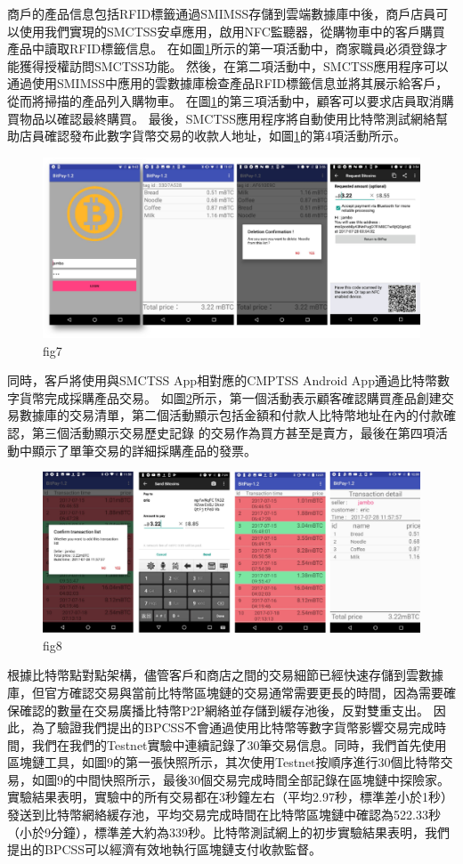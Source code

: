 商戶的產品信息包括RFID標籤通過SMIMSS存儲到雲端數據庫中後，商戶店員可以使用我們實現的SMCTSS安卓應用，啟用NFC監聽器，從購物車中的客戶購買產品中讀取RFID標籤信息。 在如圖\ref{fig7}所示的第一項活動中，商家職員必須登錄才能獲得授權訪問SMCTSS功能。 然後，在第二項活動中，SMCTSS應用程序可以通過使用SMIMSS中應用的雲數據庫檢查產品RFID標籤信息並將其展示給客戶，從而將掃描的產品列入購物車。 在圖\ref{fig7}的第三項活動中，顧客可以要求店員取消購買物品以確認最終購買。 最後，SMCTSS應用程序將自動使用比特幣測試網絡幫助店員確認發布此數字貨幣交易的收款人地址，如圖\ref{fig7}的第4項活動所示。    
\begin{figure}[h]
	\centering
	\includegraphics[width = 1\textwidth]{fig7.png}
	\caption{fig7}\label{fig7}
\end{figure}
同時，客戶將使用與SMCTSS App相對應的CMPTSS Android App通過比特幣數字貨幣完成採購產品交易。 如圖\ref{fig8}所示，第一個活動表示顧客確認購買產品創建交易數據庫的交易清單，第二個活動顯示包括金額和付款人比特幣地址在內的付款確認，第三個活動顯示交易歷史記錄 的交易作為買方甚至是賣方，最後在第四項活動中顯示了單筆交易的詳細採購產品的發票。    
\begin{figure}[h]
	\centering
	\includegraphics[width = 1\textwidth]{fig8.png}
	\caption{fig8}\label{fig8}
\end{figure}

根據比特幣點對點架構，儘管客戶和商店之間的交易細節已經快速存儲到雲數據庫，但官方確認交易與當前比特幣區塊鏈的交易通常需要更長的時間，因為需要確保確認的數量在交易廣播比特幣P2P網絡並存儲到緩存池後，反對雙重支出。
因此，為了驗證我們提出的BPCSS不會通過使用比特幣等數字貨幣影響交易完成時間，我們在我們的Testnet實驗中連續記錄了30筆交易信息。同時，我們首先使用區塊鏈工具，如圖9的第一張快照所示，其次使用Testnet按順序進行30個比特幣交易，如圖9的中間快照所示，最後30個交易完成時間全部記錄在區塊鏈中探險家。實驗結果表明，實驗中的所有交易都在3秒鐘左右（平均2.97秒，標準差小於1秒）發送到比特幣網絡緩存池，平均交易完成時間在比特幣區塊鏈中確認為522.33秒（小於9分鐘），標準差大約為339秒。比特幣測試網上的初步實驗結果表明，我們提出的BPCSS可以經濟有效地執行區塊鏈支付收款監督。    
